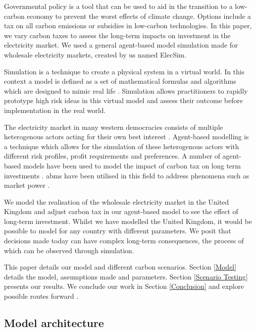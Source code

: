 Governmental policy is a tool that can be used to aid in the transition to a low-carbon economy to prevent the worst effects of climate change. Options include a tax on all carbon emissions or subsidies in low-carbon technologies. In this paper, we vary carbon taxes to assess the long-term impacts on investment in the electricity market. We used a general agent-based model simulation made for wholesale electricity markets, created by us named ElecSim. 


Simulation is a technique to create a physical system in a virtual world.  In this context a model is defined as a set of mathematical formulas and algorithms which are designed to mimic real life \cite{Forshaw2016}. Simulation allows practitioners to rapidly prototype high risk ideas in this virtual model and assess their outcome before implementation in the real world.

The electricity market in many western democracies consists of multiple heterogenous actors acting for their own best interest \cite{Most2010}. Agent-based modelling is a technique which allows for the simulation of these heterogenous actors with different risk profiles, profit requirements and preferences. A number of agent-based models have been used to model the impact of carbon tax on long term investments \cite{Tang2015, Chen2014, Chappin2017}. \acrshort{abm}s have been utilised in this field to address phenomena such as market power \cite{Ringler2016a}.

We model the realisation of the wholesale electricity market in the United Kingdom and adjust carbon tax in our agent-based model to see the effect of long-term investment. Whilst we have modelled the United Kingdom, it would be possible to model for any country with different parameters. We posit that decisions made today can have complex long-term consequences, the process of which can be observed through simulation.



This paper details our model and different carbon scenarios. Section \ref{Model} details the model, assumptions made and parameters. Section \ref{Scenario Testing} presents our results. We conclude our work in Section \ref{Conclusion} and explore possible routes forward .


\subsection{Model architecture}


